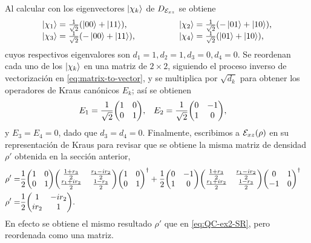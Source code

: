 Al calcular con los eigenvectores $\ket{\chi_k}$ de $D_{\mathcal{E}_{xz}}$  se obtiene
\begin{align}
\begin{tabular}{lcl}
$\ket{\chi_1}=\frac{1}{\sqrt{2}}\qty(\ket{00}+\ket{11})$, & \hspace{1cm}
& $ \ket{\chi_{2}}=\frac{1}{\sqrt{2}}\qty(-\ket{01}+\ket{10})$, \\
$\ket{\chi_{3}}=\frac{1}{\sqrt{2}}\qty(-\ket{00}+\ket{11})$, & \hspace{1cm}
& $\ket{\chi_4}=\frac{1}{\sqrt{2}}\qty(\ket{01}+\ket{10})$,
\end{tabular}
\end{align}
cuyos respectivos eigenvalores son $d_1=1,d_2=1,d_3=0,d_4=0$. 
Se reordenan cada uno de los $\ket{\chi_k}$ en una matriz
de $2\times2$, siguiendo el proceso inverso de vectorización
en \eqref{eq:matrix-to-vector}, y se multiplica por $\sqrt{d_k}$ 
para obtener los operadores de Kraus canónicos $E_k$; así se obtienen
\begin{align}
E_1&=
\frac{1}{\sqrt{2}}
\mqty(
1 & 0\\
0 & 1
),
&
E_2&=
\frac{1}{\sqrt{2}}
\mqty(
0 & -1\\
1 & 0
),
\end{align}
y $E_3=E_4=0$, dado que $d_3=d_4=0$. 
Finalmente, escribimos a $\mathcal{E}_{xz}\qty(\rho)$ en su representación 
de Kraus para revisar que se obtiene la misma matriz
de densidad $\rho'$ obtenida en la sección anterior,
\begin{align}
\rho'=&
\frac{1}{2}
\mqty(
1 & 0\\
0 & 1
)
\mqty(
\frac{1+r_3}{2}& \frac{r_1-ir_2}{2}\\
\frac{r_1+ir_2}{2} & \frac{1-r_3}{2}
)
\mqty(
1 & 0\\
0 & 1
)^{\dagger}
+
\frac{1}{2}
\mqty(
0 & -1\\
1 & 0
)
\mqty(
\frac{1+r_3}{2}& \frac{r_1-ir_2}{2}\\
\frac{r_1+ir_2}{2} & \frac{1-r_3}{2}
)
\mqty(
0 & 1\\
-1 & 0
)^{\dagger}&
\nonumber\\
\rho'=&
\frac{1}{2}
\mqty(
1 & -ir_2\\
ir_2 & 1
).
\label{eq:QC-ex2-KR}
\end{align}
En efecto se obtiene el mismo resultado $\rho'$ que 
en  \eqref{eq:QC-ex2-SR}, pero reordenada como una matriz. 


